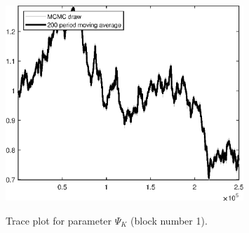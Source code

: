 \begin{figure}[H]
\centering
  \includegraphics[width=0.8\textwidth]{BRS_imp_mobility_alt/graphs/TracePlot_Psi_K_blck_1}\\
    \caption{Trace plot for parameter ${\Psi_K}$ (block number 1).}
\end{figure}
